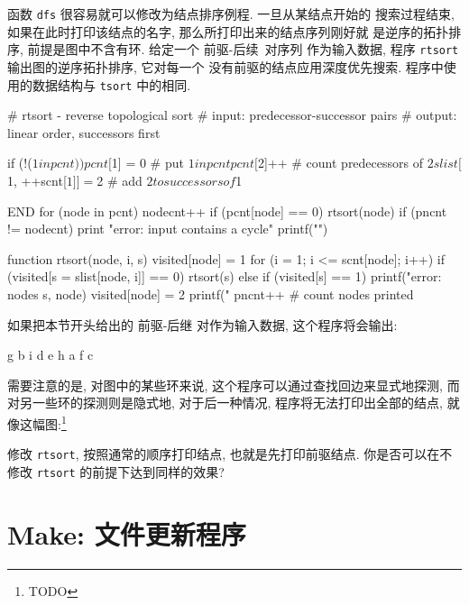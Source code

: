 函数 \texttt{dfs} 很容易就可以修改为结点排序例程. 一旦从某结点开始的
搜索过程结束, 如果在此时打印该结点的名字, 那么所打印出来的结点序列刚好就
是逆序的拓扑排序, 前提是图中不含有环. 给定一个 \mbox{前驱}-后续\ 对序列
作为输入数据, 程序 \texttt{rtsort} 输出图的逆序拓扑排序, 它对每一个
没有前驱的结点应用深度优先搜索. 程序中使用的数据结构与 \texttt{tsort}
中的相同.
\begin{awkcode}
    # rtsort - reverse topological sort
    #   input:  predecessor-successor pairs
    #   output: linear order, successors first

        { if (!($1 in pcnt))
              pcnt[$1] = 0           # put $1 in pcnt
          pcnt[$2]++                 # count predecessors of $2
          slist[$1, ++scnt[$1]] = $2 # add $2 to successors of $1
        }

    END { for (node in pcnt) {
              nodecnt++
              if (pcnt[node] == 0)
                  rtsort(node)
          }
          if (pncnt != nodecnt)
              print "error: input contains a cycle"
          printf("\n")
        }

    function rtsort(node,     i, s) {
        visited[node] = 1
        for (i = 1; i <= scnt[node]; i++)
            if (visited[s = slist[node, i]] == 0)
                rtsort(s)
            else if (visited[s] == 1)
                printf("error: nodes %
                    s, node)
        visited[node] = 2
        printf(" %
        pncnt++    # count nodes printed
    }
\end{awkcode}

如果把本节开头给出的 \mbox{前驱}-后继 对作为输入数据, 这个程序将会输出:
\begin{shell}
    g b i d e h a f c
\end{shell}
需要注意的是, 对图中的某些环来说, 这个程序可以通过查找回边来显式地探测,
而对另一些环的探测则是隐式地, 对于后一种情况, 程序将无法打印出全部的结点,
就像这幅图:\footnote{TODO}


\begin{exercise}
    修改 \texttt{rtsort}, 按照通常的顺序打印结点, 也就是先打印前驱结点.
    你是否可以在不修改 \texttt{rtsort} 的前提下达到同样的效果?
\end{exercise}

\section{Make: 文件更新程序}
\label{sec:make_a_file_updating_program}

